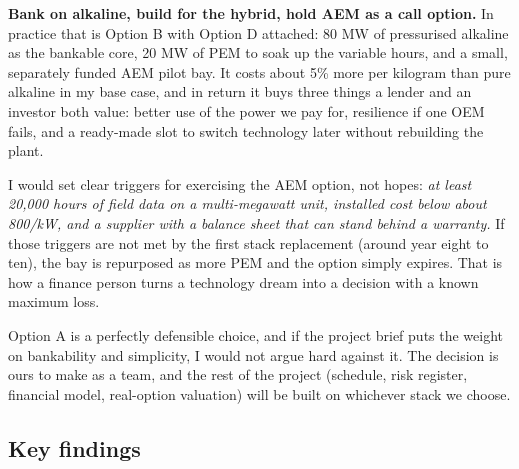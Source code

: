 \begin{verdict}
\textbf{Bank on alkaline, build for the hybrid, hold AEM as a call option.} In practice that is Option B with Option D attached: 80 MW of pressurised alkaline as the bankable core, 20 MW of PEM to soak up the variable hours, and a small, separately funded AEM pilot bay. It costs about 5\% more per kilogram than pure alkaline in my base case, and in return it buys three things a lender and an investor both value: better use of the power we pay for, resilience if one OEM fails, and a ready-made slot to switch technology later without rebuilding the plant.

\smallskip I would set clear triggers for exercising the AEM option, not hopes: \emph{at least 20,000 hours of field data on a multi-megawatt unit, installed cost below about \usd{}800/kW, and a supplier with a balance sheet that can stand behind a warranty.} If those triggers are not met by the first stack replacement (around year eight to ten), the bay is repurposed as more PEM and the option simply expires. That is how a finance person turns a technology dream into a decision with a known maximum loss. \confM
\end{verdict}

Option A is a perfectly defensible choice, and if the project brief puts the weight on bankability and simplicity, I would not argue hard against it. The decision is ours to make as a team, and the rest of the project (schedule, risk register, financial model, real-option valuation) will be built on whichever stack we choose.

\subsection{Key findings}

